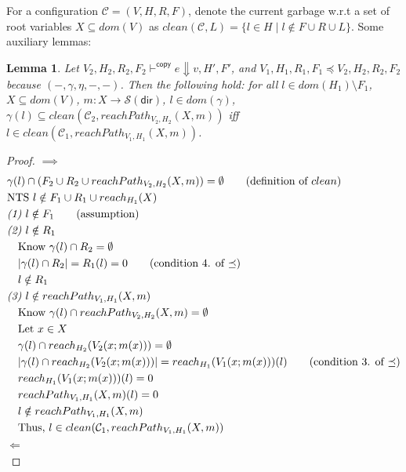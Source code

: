 \documentclass[11pt]{article}
\newcommand{\ms}[1]{\ensuremath{\mathsf{#1}}}
\newtheorem{lemma}[theorem]{Lemma}
\theoremstyle{definition}
\begin{document}
For a configuration $\mathcal{C} = (V,H,R,F)$, denote the current garbage w.r.t a set of root variables 
$X \subseteq dom(V)$ 
as $clean(\mathcal{C},L) = \{l \in H \mid l \notin F \cup R \cup L\}$. Some auxiliary lemmas: 

\begin{lemma}\label{itm:aux}
Let $V_2,H_2,R_2,F_2 \vdash^{\mathsf{copy}} e \Downarrow v,H',F'$, and 
$V_1,H_1,R_1,F_1 \preceq V_2,H_2,R_2,F_2$ because $(-,\gamma,\eta,-,-)$. Then the following hold:
for all $l \in dom(H_1) \setminus F_1$, 
	$X \subseteq dom(V)$, $m : X \to \mathcal{S}(\ms{dir})$, $l \in dom(\gamma)$,
	$\gamma(l) \subseteq clean(\mathcal{C}_2,reachPath_{V_2,H_2}(X,m))$ iff
	$l \in clean(\mathcal{C}_1,reachPath_{V_1,H_1}(X,m))$.
\end{lemma}

\begin{proof}
	$\implies$
	\begin{align*}
		&\gamma(l) \cap (F_2 \cup R_2 \cup reachPath_{V_2,H_2}(X,m)) = 
			\emptyset \tag{definition of $clean$}\\
		&\text{NTS } l \notin F_1 \cup R_1 \cup reach_{H_1}(X)\\
		&\emph{(1) } l \notin F_1 \tag{assumption}\\
		&\emph{(2) } l \notin R_1\\
		&\quad \text{Know } \gamma(l) \cap R_2 = \emptyset\\
		&\quad |\gamma(l) \cap R_2| = R_1(l) = 0 \tag{condition 4. of $\preceq$}\\
		&\quad l \notin R_1\\
		&\emph{(3) } l \notin reachPath_{V_1,H_1}(X,m)\\
		&\quad \text{Know } \gamma(l) \cap reachPath_{V_2,H_2}(X,m) = \emptyset\\
		&\quad \text{Let } x \in X\\
		&\quad \gamma(l) \cap reach_{H_2}(V_2(x;m(x))) = \emptyset\\
		&\quad |\gamma(l) \cap reach_{H_2}(V_2(x;m(x)))| = reach_{H_1}(V_1(x;m(x)))(l) 
			\tag{condition 3. of $\preceq$}\\
		&\quad reach_{H_1}(V_1(x;m(x)))(l) = 0\\
		&\quad reachPath_{V_1,H_1}(X,m)(l) = 0\\
		&\quad l \notin reachPath_{V_1,H_1}(X,m)\\
		&\quad \text{Thus, } l \in clean(\mathcal{C}_1,reachPath_{V_1,H_1}(X,m))
	\end{align*}
	$\Longleftarrow$
	\begin{align*}

\end{align*}
\end{proof}
\end{document}
